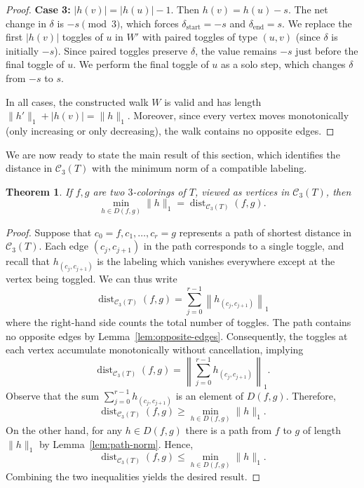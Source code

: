 \documentclass[12pt,reqno]{amsart}
\newtheorem{thm}{Theorem}[section]
\theoremstyle{definition}
\newcommand{\C}{\mathcal{C}}
\newcommand{\dist}{\operatorname{dist}}
\begin{document}
\begin{proof}
\textbf{Case 3:} $|h(v)|=|h(u)|-1$. Then $h(v)=h(u)-s$. The net change in $\delta$ is $-s \pmod{3}$, which forces $\delta_{\text{start}}=-s$ and $\delta_{\text{end}}=s$. We replace the first $|h(v)|$ toggles of $u$ in $W'$ with paired toggles of type $(u, v)$ (since $\delta$ is initially $-s$). Since paired toggles preserve $\delta$, the value remains $-s$ just before the final toggle of $u$. We perform the final toggle of $u$ as a solo step, which changes $\delta$ from $-s$ to $s$.

In all cases, the constructed walk $W$ is valid and has length $\|h'\|_1 + |h(v)| = \|h\|_1$. Moreover, since every vertex moves monotonically (only increasing or only decreasing), the walk contains no opposite edges. \end{proof}


We are now ready to state the main result of this section, which identifies the distance in $\C_3(T)$ with the minimum norm of a compatible labeling.

\begin{thm}\label{thm:labelings} If $f,g$ are two $3$-colorings of $T$, viewed as vertices in $\C_3(T)$, then 
$$\min_{h\in D(f,g)}\|h\|_1=\dist_{\C_3(T)}(f,g).$$
\end{thm}

\begin{proof}
    Suppose that $c_0=f, c_1, \dots, c_r=g$ represents a path of shortest distance in $\C_3(T)$. Each edge $(c_j,c_{j+1})$ in the path corresponds to a single toggle, and recall that $h_{(c_j,c_{j+1})}$ is the labeling which vanishes everywhere except at the vertex being toggled. We can thus write
    $$\dist_{\C_3(T)}(f,g)=\sum_{j=0}^{r-1}\left\|h_{(c_j, c_{j+1})}\right\|_1$$
    where the right-hand side counts the total number of toggles. The path contains no opposite edges by Lemma~\ref{lem:opposite-edges}. Consequently, the toggles at each vertex accumulate monotonically without cancellation, implying
    \[
    \dist_{\C_3(T)}(f,g)=\left\|\sum_{j=0}^{r-1}h_{(c_j,c_{j+1})}\right\|_1.
    \]
    Observe that the sum $\sum_{j=0}^{r-1}h_{(c_j,c_{j+1})}$ is an element of $D(f,g)$. Therefore, 
    \[
    \dist_{\C_3(T)}(f,g)\geq \min_{h\in D(f,g)}\|h\|_1.
    \]
    On the other hand, for any $h\in D(f,g)$ there is a path from $f$ to $g$ of length $\|h\|_1$ by Lemma~\ref{lem:path-norm}. Hence,
    \[
    \dist_{\C_3(T)}(f,g)\leq \min_{h\in D(f,g)}\|h\|_1.
    \]
    Combining the two inequalities yields the desired result.
\end{proof}
\end{document}
